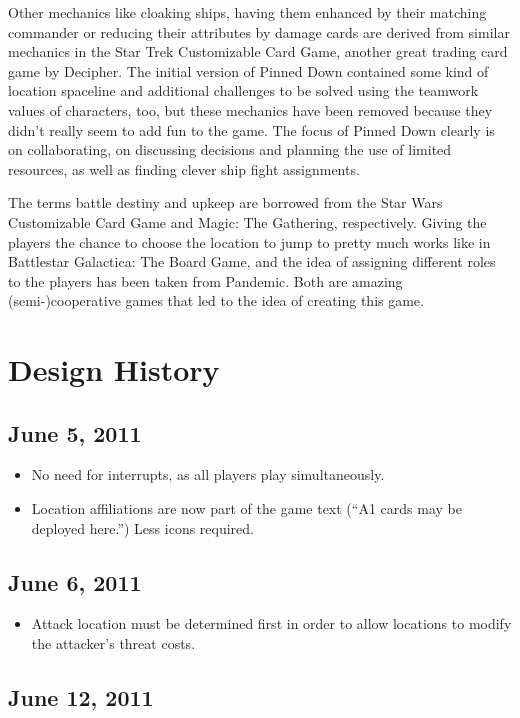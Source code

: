 \documentclass[11pt, a4paper]{article}
\begin{document}
Other mechanics like cloaking ships, having them enhanced by their matching
commander or reducing their attributes by damage cards are derived from similar
mechanics in the Star Trek Customizable Card Game, another great trading card
game by Decipher. The initial version of Pinned Down contained some kind of
location spaceline and additional challenges to be solved using the teamwork
values of characters, too, but these mechanics have been removed because they
didn't really seem to add fun to the game. The focus of Pinned Down clearly is
on collaborating, on discussing decisions and planning the use of limited
resources, as well as finding clever ship fight assignments.

The terms battle destiny and upkeep are borrowed from the Star Wars Customizable
Card Game and Magic: The Gathering, respectively. Giving the players the chance
to choose the location to jump to pretty much works like in Battlestar
Galactica: The Board Game, and the idea of assigning different roles to the
players has been taken from Pandemic. Both are amazing (semi-)cooperative games
that led to the idea of creating this game.

\section{Design History}
\subsection{June 5, 2011}

\begin{itemize}
 \item No need for interrupts, as all players play simultaneously.
 \item Location affiliations are now part of the game text
(``A1 cards may be deployed here.'') Less icons required.
\end{itemize}

\subsection{June 6, 2011}

\begin{itemize}
 \item Attack location must be determined first in order to allow locations to
modify the attacker's threat costs.
\end{itemize}

\subsection{June 12, 2011}
\end{document}
